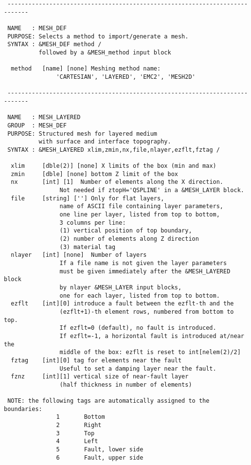 \begin{verbatim}
 ----------------------------------------------------------------------------

 NAME   : MESH_DEF
 PURPOSE: Selects a method to import/generate a mesh.
 SYNTAX : &MESH_DEF method /
          followed by a &MESH_method input block

  method   [name] [none] Meshing method name:
               'CARTESIAN', 'LAYERED', 'EMC2', 'MESH2D'
               
 ----------------------------------------------------------------------------

 NAME   : MESH_LAYERED
 GROUP  : MESH_DEF
 PURPOSE: Structured mesh for layered medium 
          with surface and interface topography. 
 SYNTAX : &MESH_LAYERED xlim,zmin,nx,file,nlayer,ezflt,fztag /

  xlim     [dble(2)] [none] X limits of the box (min and max)
  zmin     [dble] [none] bottom Z limit of the box 
  nx       [int] [1]  Number of elements along the X direction.
                Not needed if ztopH='QSPLINE' in a &MESH_LAYER block.
  file     [string] [''] Only for flat layers,
                name of ASCII file containing layer parameters, 
                one line per layer, listed from top to bottom, 
                3 columns per line:
                (1) vertical position of top boundary,
                (2) number of elements along Z direction
                (3) material tag
  nlayer   [int] [none]  Number of layers
                If a file name is not given the layer parameters
                must be given immediately after the &MESH_LAYERED block
                by nlayer &MESH_LAYER input blocks,
                one for each layer, listed from top to bottom.
  ezflt    [int][0] introduce a fault between the ezflt-th and the
                (ezflt+1)-th element rows, numbered from bottom to top. 
                If ezflt=0 (default), no fault is introduced.
                If ezflt=-1, a horizontal fault is introduced at/near the 
                middle of the box: ezflt is reset to int[nelem(2)/2]
  fztag    [int][0] tag for elements near the fault
                Useful to set a damping layer near the fault.
  fznz     [int][1] vertical size of near-fault layer
                (half thickness in number of elements) 

 NOTE: the following tags are automatically assigned to the boundaries: 
               1       Bottom 
               2       Right        
               3       Top  
               4       Left
               5       Fault, lower side
               6       Fault, upper side


\end{verbatim}

